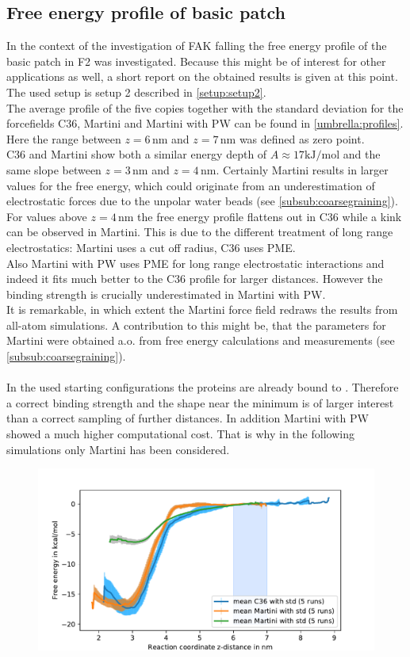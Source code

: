 \subsection{Free energy profile of basic patch}
\label{results:umbrella}
In the context of the investigation of FAK falling the free energy profile of the basic patch in F2 was investigated. Because this might be of interest for other applications as well, a short report on the obtained results is given at this point. The used setup is setup 2 described in \autoref{setup:setup2}.\\
The average profile of the five copies together with the standard deviation for the forcefields C36, Martini and Martini with PW can be found in \autoref{umbrella:profiles}. Here the range between $z = 6\,\si{\nano\metre}$ and $z = 7\,\si{\nano\metre}$ was defined as zero point.\\
C36 and Martini show both a similar energy depth of $A \approx 17 \si{\kilo\joule/\mole}$ and the same slope between $z = 3\,\si{\nano\metre}$ and $z = 4\,\si{\nano\metre}$. Certainly Martini results in larger values for the free energy, which could originate from an underestimation of electrostatic forces due to the unpolar water beads (see \autoref{subsub:coarsegraining}). For values above $z = 4\,\si{\nano\metre}$ the free energy profile flattens out in C36 while a kink can be observed in Martini. This is due to the different treatment of long range electrostatics: Martini uses a cut off radius, C36 uses PME.\\
Also Martini with PW uses PME for long range electrostatic interactions and indeed it fits much better to the C36 profile for larger distances. However the binding strength is crucially underestimated in Martini with PW.\\
It is remarkable, in which extent the Martini force field redraws the results from all-atom simulations. A contribution to this might be, that the parameters for Martini were obtained a.o. from free energy calculations and measurements (see \autoref{subsub:coarsegraining}).\\
\\
In the used starting configurations the proteins are already bound to \pip{}. Therefore a correct binding strength and the shape near the minimum is of larger interest than a correct sampling of further distances. In addition Martini with PW showed a much higher computational cost. That is why in the following simulations only Martini has been considered.
%
%
%
\begin{figure}
	\centering
	\includegraphics[width=.8\textwidth]{figures/results/umbrella}
	\label{umbrella:profiles}
\end{figure}
%
%
%